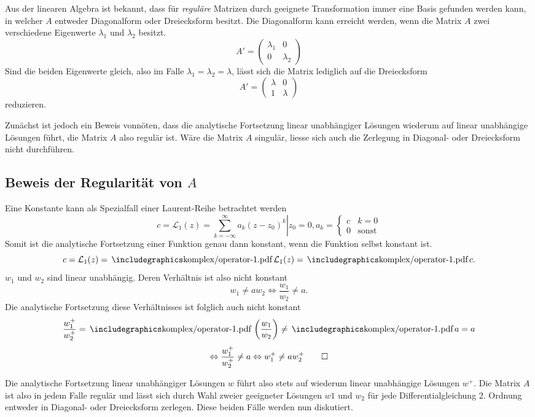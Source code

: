 Aus der linearen Algebra ist bekannt, dass für \emph{reguläre} Matrizen durch geeignete Transformation immer eine Basis gefunden werden kann, in welcher $A$ entweder Diagonalform oder Dreiecksform besitzt.
Die Diagonalform kann erreicht werden, wenn die Matrix $A$ zwei verschiedene Eigenwerte $\lambda_1$ und $\lambda_2$ besitzt. 
$$A'=\begin{pmatrix}
\lambda_1 & 0 \\ 
0 & \lambda_2 \end{pmatrix}$$
Sind die beiden Eigenwerte gleich, also im Falle $\lambda_1=\lambda_2=\lambda$, lässt sich die Matrix lediglich auf die Dreiecksform
$$A'=\begin{pmatrix}\lambda & 0 \\ 1 & \lambda\end{pmatrix}$$
reduzieren.

Zunächst ist jedoch ein Beweis vonnöten, dass die analytische Fortsetzung linear unabhängiger Lösungen wiederum auf linear unabhängige Lösungen führt, die Matrix $A$ also regulär ist. Wäre die Matrix $A$ singulär, liesse sich auch die Zerlegung in Diagonal- oder Dreiecksform nicht durchführen.

\subsection{Beweis der Regularität von $A$}
Eine Konstante kann als Spezialfall einer Laurent-Reihe betrachtet werden
$$c = \mathcal{L}_1(z)=\sum_{k=-\infty}^{\infty}a_k(z-z_0)^k\left\vert z_0=0, a_k=\begin{cases}
c&k=0\\0&\text{sonst}
\end{cases}\right.$$
Somit ist die analytische Fortsetzung einer Funktion genau dann konstant, wenn die Funktion selbst konstant ist.
$$c = \mathcal{L}_1(z)= \sk \mathcal{L}_1(z) = \sk c.$$
$w_1$ und $w_2$ sind linear unabhängig. Deren Verhältnis ist also nicht konstant
$$w_1\ne a w_2\Leftrightarrow\frac{w_1}{w_2}\ne a.$$
Die analytische Fortsetzung diese Verhältnisses ist folglich auch nicht konstant
$$\frac{w_1^+}{w_2^+}=\sk \left(\frac{w_1}{w_2}\right) \ne \sk a = a $$
$$\Leftrightarrow \frac{w_1^+}{w_2^+}\ne a\Leftrightarrow w_1^+\ne aw_2^+\qed
$$

Die analytische Fortsetzung linear unabhängiger Lösungen $w$ führt also stets auf wiederum linear unabhängige Lösungen $w^+$. Die Matrix $A$ ist also in jedem Falle regulär und lässt sich durch Wahl zweier geeigneter Lösungen $w1$ und $w_2$ für jede Differentialgleichung 2. Ordnung entweder in Diagonal- oder Dreiecksform zerlegen. Diese beiden Fälle werden nun diskutiert.


